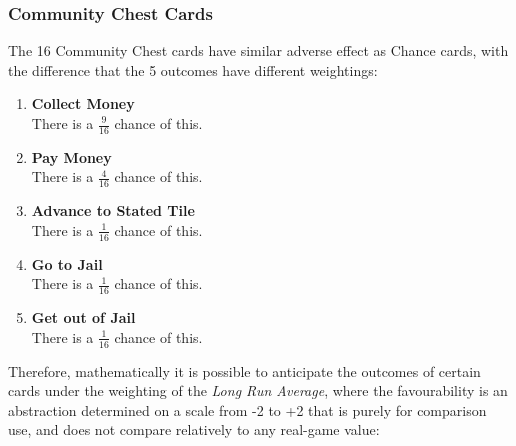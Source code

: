 \documentclass[12pt]{article}
\begin{document}
\subsubsection{Community Chest Cards}
\label{Community Chest Probabilities}
The 16 Community Chest cards have similar adverse effect as Chance cards, with the difference that the 5 outcomes have different weightings:
\begin{enumerate}
  \item \textbf{Collect Money} \hfill\\
  There is a $\frac{9}{16}$ chance of this.
  \item \textbf{Pay Money} \hfill\\
  There is a $\frac{4}{16}$ chance of this.
  \item \textbf{Advance to Stated Tile} \hfill\\
  There is a $\frac{1}{16}$ chance of this.
  \item \textbf{Go to Jail} \hfill\\
  There is a $\frac{1}{16}$ chance of this.
  \item \textbf{Get out of Jail} \hfill\\
  There is a $\frac{1}{16}$ chance of this.
\end{enumerate}
Therefore, mathematically it is possible to anticipate the outcomes of certain cards under the weighting of the \emph{Long Run Average}, where the favourability is an abstraction determined on a scale from -2 to +2 that is purely for comparison use, and does not compare relatively to any real-game value:
\end{document}
